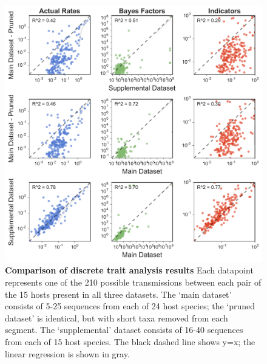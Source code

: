 \begin{figure}[h!]
  \begin{centering}
    \includegraphics[width=\linewidth]{./png/siv_dataset_comparison.png}
  	\caption[Comparison of discrete trait analysis results]{\textbf{Comparison of discrete trait analysis results }
Each datapoint represents one of the 210 possible transmissions between each pair of the 15 hosts present in all three datasets.
The `main dataset' consists of 5-25 sequences from each of 24 host species; the `pruned dataset' is identical, but with short taxa removed from each segment.
The `supplemental' dataset consists of 16-40 sequences from each of 15 host species.
The black dashed line shows y=x; the linear regression is shown in gray.
        }
  	\label{siv_dataset_comparison}
  \end{centering}
\end{figure}

